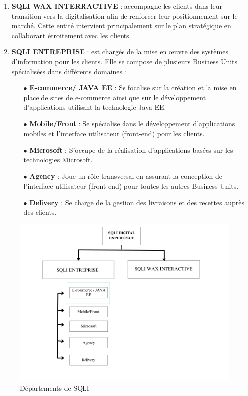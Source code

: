 \begin{enumerate}
    \item \textbf{SQLI WAX INTERRACTIVE} : accompagne les clients dans leur transition vers la digitalisation afin de renforcer leur positionnement sur le marché. Cette entité intervient principalement sur le plan stratégique en collaborant étroitement avec les clients.
     \item \textbf{SQLI ENTREPRISE} : est chargée de la mise en œuvre des systèmes d'information pour les clients. Elle se compose de plusieurs Business Units spécialisées dans différents domaines :
\begin{itemize}

    \item [$\bullet$]\textbf{E-commerce/ JAVA EE} : Se focalise sur la création et la mise en place de sites de e-commerce ainsi que sur le développement d’applications utilisant la technologie Java EE.
    \item [$\bullet$]\textbf{Mobile/Front} : Se spécialise dans le développement d’applications mobiles et l’interface utilisateur (front-end) pour les clients.
    \item [$\bullet$]\textbf{Microsoft} : S'occupe de la réalisation d’applications basées sur les technologies Microsoft.
    \item [$\bullet$]\textbf{Agency} : Joue un rôle transversal en assurant la conception de l’interface utilisateur (front-end) pour toutes les autres Business Units.
    \item [$\bullet$]\textbf{Delivery} : Se charge de la gestion des livraisons et des recettes auprès des clients.
\end{itemize}
\end{enumerate}
\vspace{0.5cm}
\begin{figure}[H]  
  \centering  
  \includegraphics[width=14cm]{Figures/departement.png}
  \caption{Départements de SQLI}
  \label{fig:departement}
\end{figure}


